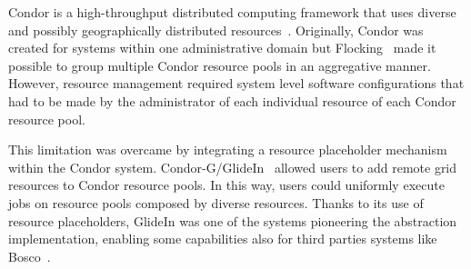 \documentclass{sig-alternate}
\begin{document}


Condor is a high-throughput distributed computing framework that uses
diverse and possibly geographically distributed resources~\cite{thain2005}.
Originally, Condor was created for systems within one administrative domain but
Flocking~\cite{Epema:1996:flocking} made it possible to group multiple Condor
resource pools in an aggregative manner. However, resource management required
system level software configurations that had to be made by the administrator of
each individual resource of each Condor resource pool.


This limitation was overcame by integrating a resource placeholder mechanism
within the Condor system. Condor-G/GlideIn~\cite{condor-g} allowed users to add
remote grid resources to Condor resource pools. In this way, users could
uniformly execute jobs on resource pools composed by diverse resources. Thanks
to its use of resource placeholders, GlideIn was one of the systems
pioneering the \pilot abstraction implementation, enabling some \pilot
capabilities also for third parties systems like Bosco~\cite{bosco}.

 
\end{document}
